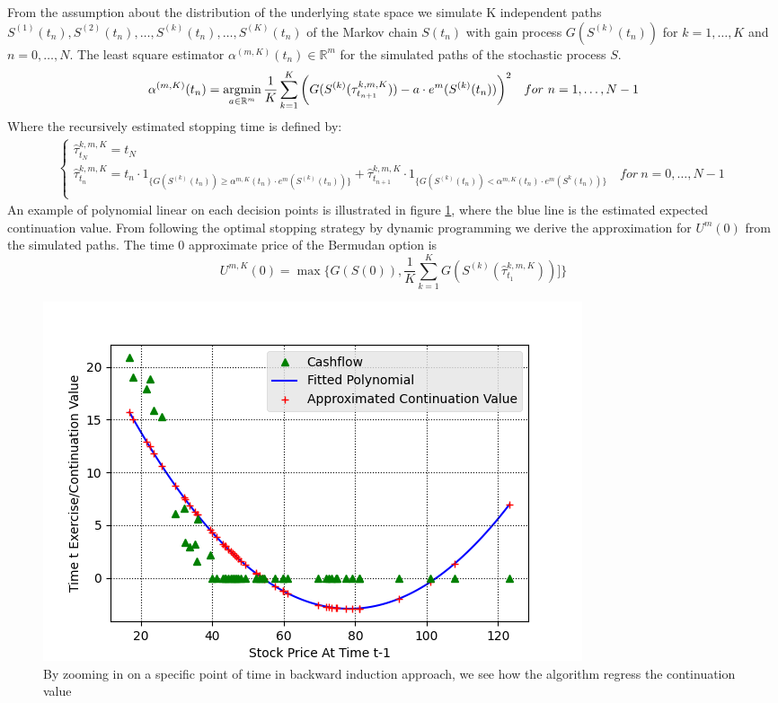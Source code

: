 From the assumption about the distribution of the underlying state space we simulate K independent paths $S^{(1)}(t_n), S^{(2)}(t_n), \ldots, S^{(k)}(t_n), \ldots, S^{(K)}(t_n)$ of the Markov chain $S(t_n)$ with gain process $G(S^{(k)}(t_n))$ for $k=1, \ldots, K$ and $n=0,\ldots,N$. The least square estimator $\alpha^{(m,K)}(t_n)\in \mathbb{R}^m$ for the simulated paths of the stochastic process $S$.
\begin{equation}\label{LSMestimator}
\alpha^{(m,K)}(t_n)= \operatorname*{argmin}_{a\in \mathbb{R}^m} \dfrac{1}{K}\sum_{k=1}^{K} \bigg(G(S^{(k)}(\tau^{k,m,K}_{t_{n+1}}))  -a \cdot e^m(S^{(k)}(t_{n})) \bigg)^2 \quad for \ n=1, \ldots, N-1
\end{equation}
Where the recursively estimated stopping time is defined by:
\begin{equation}\label{LSMDynamic3}
\begin{split}
\begin{cases}
          \hat{\tau}_{t_N}^{k,m,K} = t_N\\
          \hat{\tau}_{t_n}^{k,m,K} = t_n \cdot 1_{\{G(S^{(k)}(t_n)) \geq \alpha^{m,K}(t_{n}) \cdot e^m(S^{(k)}(t_{n})) \}} + \hat{\tau}_{t_{n+1}}^{k,m,K} \cdot 1_{\{G(S^{(k)}(t_n)) < \alpha^{m,K}(t_{n}) \cdot e^m(S^{k}(t_{n})) \}} \quad for \ n={0,\ldots,N-1} \\ 
\end{cases}
\end{split}
\end{equation}
An example of polynomial linear on each decision points is illustrated in figure \ref{fig:LSM1}, where the blue line is the estimated expected continuation value. From following the optimal stopping strategy by dynamic programming we derive the approximation for $U^{m}(0)$ from the simulated paths. The time 0 approximate price of the Bermudan option is
\begin{equation}
U^{m,K}(0) = \max \{ G(S(0)), \frac{1}{K} \sum_{k=1}^{K} G(S^{(k)}(\hat{\tau}^{k,m,K}_{t_1}))]\}
\end{equation}

\begin{figure}[th]
\centering
\includegraphics{Figures/LSMFit1.png}
\decoRule
\caption[Polynomial Regression Of Continuation Value]{By zooming in on a specific point of time in backward induction approach, we see how the algorithm regress the continuation value}
\label{fig:LSM1}
\end{figure}


